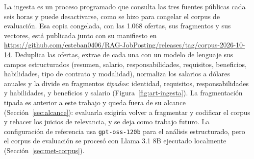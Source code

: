 \label{sec:art-ingesta}La ingesta es un proceso programado que consulta las tres fuentes públicas cada seis horas y puede desactivarse, como se hizo para congelar el corpus de evaluación. Esa copia congelada, con las 1.068 ofertas, sus fragmentos y sus vectores, está publicada junto con su manifiesto en \url{https://github.com/esteban0406/RAG-JobPosting/releases/tag/corpus-2026-10-14}. Deduplica las ofertas, extrae de cada una con un modelo de lenguaje sus campos estructurados (resumen, salario, responsabilidades, requisitos, beneficios, habilidades, tipo de contrato y modalidad), normaliza los salarios a dólares anuales y la divide en fragmentos \emph{tipados}: identidad, requisitos, responsabilidades y habilidades, y beneficios y salario (Figura~\ref{fig:art-ingesta}). La fragmentación tipada es anterior a este trabajo y queda fuera de su alcance (Sección~\ref{sec:alcance}): evaluarla exigiría volver a fragmentar y codificar el corpus y rehacer los juicios de relevancia, y se deja como trabajo futuro. La configuración de referencia usa \texttt{gpt-oss-120b} para el análisis estructurado, pero el corpus de evaluación se procesó con Llama 3.1 8B ejecutado localmente (Sección~\ref{sec:met-corpus}).

